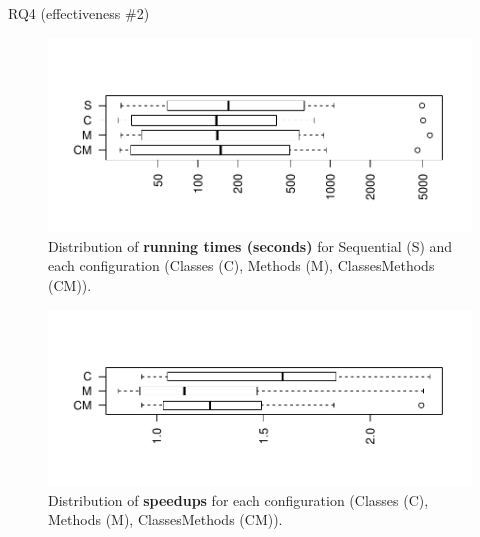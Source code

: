\documentclass{beamer}
\begin{document}
{\begin{frame}{RQ4 (effectiveness \#2)}
	\vspace{-1.2cm}
	\begin{figure}
		\centering
		\includegraphics[width=\linewidth]{images/time.pdf}
		\vspace{-1.4cm}
		\caption*{Distribution of {\rsm \textbf{\tname{} running times (seconds)}} for Sequential (S) and each configuration (Classes (C), Methods (M), ClassesMethods (CM)).}
	\end{figure}
	\vspace{-1.25cm}\pause
	\begin{figure}
		\centering
		\includegraphics[width=\linewidth]{images/speedup.pdf}
		\vspace{-1.6cm}
		\caption*{Distribution of {\rsm \textbf{speedups}} for each configuration (Classes (C), Methods (M), ClassesMethods (CM)).}
	\end{figure}
\end{frame}

\backupend

}
\end{document}
